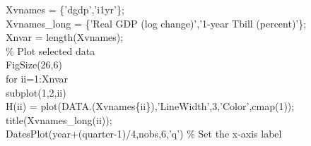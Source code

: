 \hspace{1mm}\hspace{5mm} \hspace{5mm} Xvnames      = \{\textcolor{matlabpurple}{'dgdp'},\textcolor{matlabpurple}{'i1yr'}\}; \\ 
\hspace{1mm}\hspace{5mm} \hspace{5mm} Xvnames\_long = \{\textcolor{matlabpurple}{'Real GDP (log change)'},\textcolor{matlabpurple}{'1-year Tbill (percent)'}\}; \\ 
\hspace{1mm}\hspace{5mm} \hspace{5mm} Xnvar        = length(Xvnames); \\ 
\hspace{1mm}\hspace{5mm} \hspace{5mm} \textcolor{matlabgreen}{\% Plot selected data }\\ 
\hspace{1mm}\hspace{5mm} \hspace{5mm} FigSize(26,6) \\ 
\hspace{1mm}\hspace{5mm} \hspace{5mm} \textcolor{matlabblue}{for} ii=1:Xnvar \\ 
\hspace{1mm}\hspace{5mm} \hspace{5mm} \hspace{5mm} subplot(1,2,ii) \\ 
\hspace{1mm}\hspace{5mm} \hspace{5mm} \hspace{5mm} H(ii) = plot(DATA.(Xvnames\{ii\}),\textcolor{matlabpurple}{'LineWidth'},3,\textcolor{matlabpurple}{'Color'},cmap(1)); \\ 
\hspace{1mm}\hspace{5mm} \hspace{5mm} \hspace{5mm} title(Xvnames\_long(ii));  \\ 
\hspace{1mm}\hspace{5mm} \hspace{5mm} \hspace{5mm} DatesPlot(year+(quarter-1)/4,nobs,6,\textcolor{matlabpurple}{'q'}) \textcolor{matlabgreen}{\% Set the x-axis label  }\\ 
